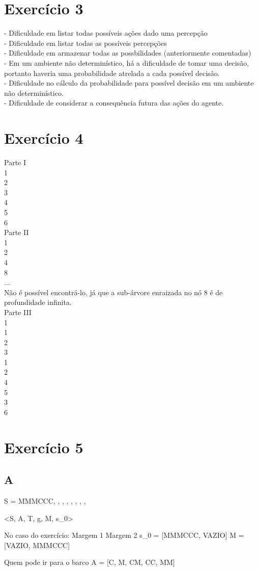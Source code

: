 \documentclass{article}
\begin{document}
\section*{Exercício 3}
- Dificuldade em listar todas possíveis ações dado uma percepção\\
- Dificuldade em listar todas as possíveis percepções\\
- Dificuldade em armazenar todas as possbilidades (anteriormente comentadas)\\
- Em um ambiente não determinístico, há a dificuldade de tomar uma decisão, portanto haveria uma probabilidade atrelada a cada possível decisão.\\
- Dificuldade no cálculo da probabilidade para possível decisão em um ambiente não determinístico.\\
- Dificuldade de considerar a consequência futura das ações do agente.\\

\section*{Exercício 4}

Parte I\\
1\\
2\\
3\\
4\\
5\\
6\\

Parte II\\
1\\
2\\
4\\
8\\
...\\

Não é possível encontrá-lo, já que a sub-árvore enraizada no nó 8 é de profundidade infinita.\\


Parte III\\
1\\
1\\
2\\
3\\
1\\
2\\
4\\
5\\
3\\
6\\

\section*{Exercício 5}
\subsection{A}

S = {
    {{MMMCCC}, },
    {},
    {},
    {},
    {},
    {},
    {},
    }


<S, A, T, g, M, s_0>

No caso do exercício:
          Margem 1   Margem 2
s_0 = [MMMCCC,   VAZIO]
M  = [VAZIO,       MMMCCC]

       Quem pode ir para o barco
A = [C, M, CM, CC, MM]
\end{document}
